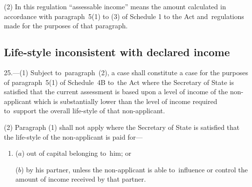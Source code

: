 \documentclass[12pt,a4paper]{article}
\begin{document}
(2) In this regulation “assessable income” means the amount calculated in accordance with paragraph~5(1) to (3) of Schedule 1 to the Act and~regulations made for the purposes of that paragraph.


\subsection[25. Life-style inconsistent with declared income]{Life-style inconsistent with declared income}

25.—(1) Subject to~paragraph~(2), a case shall constitute a case for the purposes of paragraph~5(1) of Schedule~4B to~the Act where the Secretary of State is satisfied that the current 
assessment is based upon a level of income of the non-applicant which is substantially lower than the level of income required to~support the overall life-style of that non-applicant.

%
%

(2) Paragraph (1) shall not apply where the Secretary of State is satisfied that the life-style of the non-applicant is paid for—
\begin{enumerate}\item[]
($a$) out of capital belonging to~him; or

($b$) by his partner, unless the non-applicant is able to~influence or control the amount of income received by that partner.
\end{enumerate}
\end{document}
